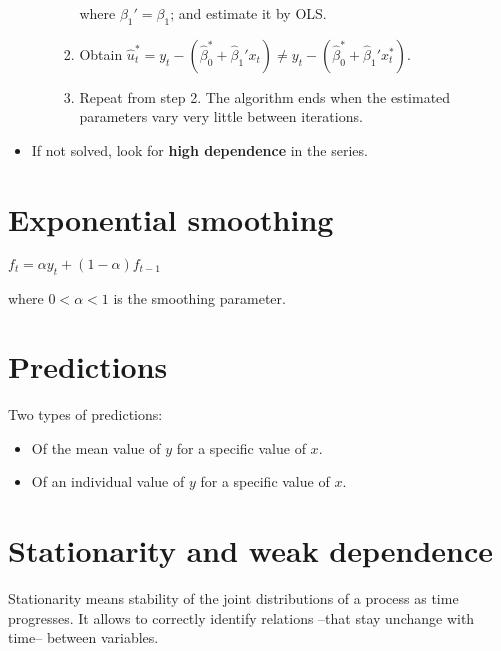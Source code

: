 \documentclass[10pt, a4paper, landscape]{article}
\begin{document}
\begin{multicols}{3}
\begin{itemize}[leftmargin=*]
\begin{itemize}[leftmargin=*]
\begin{enumerate}[leftmargin=*]
					where $\beta_{1}' = \beta_{1}$; and estimate it by OLS.
					
					\item Obtain $\hat{u}_{t}^{*} = y_{t} - (\hat{\beta}_{0}^{*} + \hat{\beta}_{1}' x_{t}) \neq y_{t} - (\hat{\beta}_{0}^{*} + \hat{\beta}_{1}' x_{t}^{*})$.
					\item Repeat from step 2. The algorithm ends when the estimated parameters vary very little between iterations.
				\end{enumerate}
			\end{itemize}
			
			\item If not solved, look for \textbf{high dependence} in the series.
		\end{itemize}
		
		\section*{Exponential smoothing}
		
		\begin{center}
			$f_{t} = \alpha y_{t} + (1 - \alpha) f_{t - 1}$
		\end{center}
		
		where $0 < \alpha < 1$ is the smoothing parameter.
		
		\section*{Predictions}
		
		Two types of predictions:
		
		\begin{itemize}[leftmargin=*]
			\item Of the mean value of $y$ for a specific value of $x$.
			\item Of an individual value of $y$ for a specific value of $x$.
		\end{itemize}
		
		\columnbreak
		
		\section*{Stationarity and weak dependence}
		
		Stationarity means stability of the joint distributions of a process as time progresses. It allows to correctly identify relations --that stay unchange with time-- between variables.
		

\end{multicols}
\end{document}
